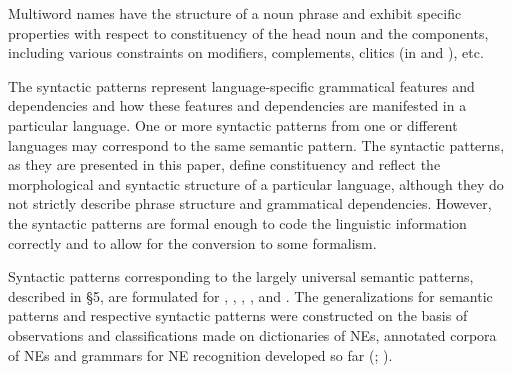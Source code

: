 \documentclass[output=paper]{langsci/langscibook}
\begin{document}
Multiword names have the structure of a noun phrase and exhibit specific
properties with respect to constituency of the head noun and the
components, including various constraints on modifiers, complements,
 clitics (in  and ), etc.



The syntactic patterns represent language-specific grammatical features
and dependencies and how these features and dependencies are manifested
in a particular language. One or more syntactic patterns from one or
different languages may correspond to the same semantic pattern. The
syntactic patterns, as they are presented in this paper, define
constituency and reflect the morphological and syntactic structure of a
particular language, although they do not strictly describe phrase
structure and grammatical dependencies. However, the syntactic patterns
are formal enough to code the linguistic information correctly and to
allow for the conversion to some formalism.



Syntactic patterns corresponding to the largely universal semantic
patterns, described in §5, are formulated for ,
, , , and .
The generalizations for semantic
patterns and respective syntactic patterns were constructed on the
basis of observations and classifications made on dictionaries of NEs,
annotated corpora of NEs and grammars for NE recognition developed so
far (\citealt{krstev2013}; \citealt{koeva2015}).


\largerpage
\end{document}
